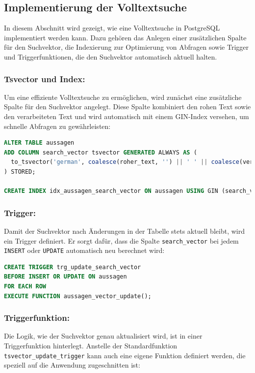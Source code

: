 \subsection{Implementierung der Volltextsuche}
In diesem Abschnitt wird gezeigt, wie eine Volltextsuche in PostgreSQL
implementiert werden kann. Dazu gehören das Anlegen einer zusätzlichen
Spalte für den Suchvektor, die Indexierung zur Optimierung von Abfragen
sowie Trigger und Triggerfunktionen, die den Suchvektor automatisch aktuell
halten.

\subsubsection*{Tsvector und Index:}
Um eine effiziente Volltextsuche zu ermöglichen, wird zunächst eine zusätzliche
Spalte für den Suchvektor angelegt. Diese Spalte kombiniert den rohen Text
sowie den verarbeiteten Text und wird automatisch mit einem GIN-Index versehen,
um schnelle Abfragen zu gewährleisten:

\begin{lstlisting}[language=SQL, caption={Speicherung und Indexierung des tsvectors}]
ALTER TABLE aussagen
ADD COLUMN search_vector tsvector GENERATED ALWAYS AS (
  to_tsvector('german', coalesce(roher_text, '') || ' ' || coalesce(verarbeiteter_text, ''))
) STORED;

CREATE INDEX idx_aussagen_search_vector ON aussagen USING GIN (search_vector);
\end{lstlisting}

\subsubsection*{Trigger:}

Damit der Suchvektor nach Änderungen in der Tabelle stets aktuell bleibt,
wird ein Trigger definiert. Er sorgt dafür, dass die Spalte \texttt{search\_vector}
bei jedem \texttt{INSERT} oder \texttt{UPDATE} automatisch neu berechnet wird:

\begin{lstlisting}[language=SQL, caption={Trigger zur automatischen Aktualisierung des Suchvektors}]
CREATE TRIGGER trg_update_search_vector
BEFORE INSERT OR UPDATE ON aussagen
FOR EACH ROW
EXECUTE FUNCTION aussagen_vector_update();
\end{lstlisting}

\subsubsection*{Triggerfunktion:}
Die Logik, wie der Suchvektor genau aktualisiert wird, ist in einer
Triggerfunktion hinterlegt. Anstelle der Standardfunktion
\texttt{tsvector\_update\_trigger} kann auch eine eigene Funktion definiert
werden, die speziell auf die Anwendung zugeschnitten ist:

